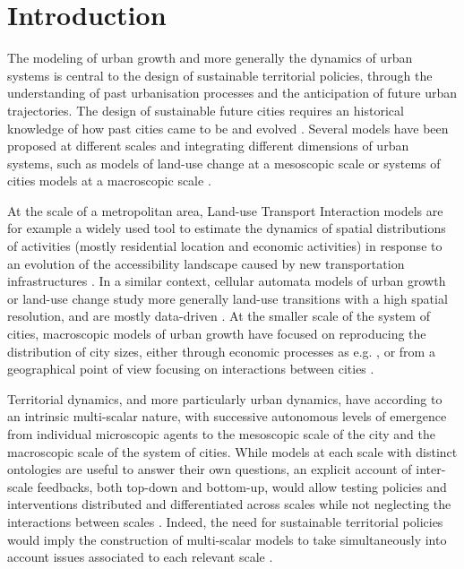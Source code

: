 \documentclass[ijgi,article,submit,moreauthors,pdftex]{Definitions/mdpi}
\begin{document}




\section{Introduction}

The modeling of urban growth and more generally the dynamics of urban systems is central to the design of sustainable territorial policies, through the understanding of past urbanisation processes and the anticipation of future urban trajectories. The design of sustainable future cities requires an historical knowledge of how past cities came to be and evolved \cite{batty2018inventing}. Several models have been proposed at different scales and integrating different dimensions of urban systems, such as models of land-use change at a mesoscopic scale or systems of cities models at a macroscopic scale \cite{pumain2017urban}.

At the scale of a metropolitan area, Land-use Transport Interaction models \cite{wegener2004land} are for example a widely used tool to estimate the dynamics of spatial distributions of activities (mostly residential location and economic activities) in response to an evolution of the accessibility landscape caused by new transportation infrastructures \cite{raimbault:halshs-02265423}. In a similar context, cellular automata models of urban growth or land-use change study more generally land-use transitions with a high spatial resolution, and are mostly data-driven \cite{clarke2007decade}. At the smaller scale of the system of cities, macroscopic models of urban growth have focused on reproducing the distribution of city sizes, either through economic processes as e.g. \cite{gabaix1999zipf}, or from a geographical point of view focusing on interactions between cities \cite{favaro2011gibrat}.

Territorial dynamics, and more particularly urban dynamics, have according to \cite{pumain1997pour} an intrinsic multi-scalar nature, with successive autonomous levels of emergence from individual microscopic agents to the mesoscopic scale of the city and the macroscopic scale of the system of cities. While models at each scale with distinct ontologies are useful to answer their own questions, an explicit account of inter-scale feedbacks, both top-down and bottom-up, would allow testing policies and interventions distributed and differentiated across scales while not neglecting the interactions between scales \cite{wegener2018multi}. Indeed, the need for sustainable territorial policies would imply the construction of multi-scalar models to take simultaneously into account issues associated to each relevant scale \cite{Rozenblat2018,raimbault:halshs-02284933}.
\end{document}
